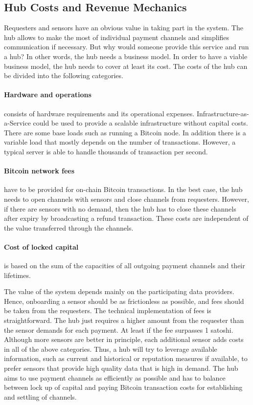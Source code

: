 \subsection{Hub Costs and Revenue Mechanics}
\label{sec:hubbiz}

Requesters and sensors have an obvious value in taking part in the system. The hub allows to make the most of individual payment channels and simplifies communication if necessary. But why would someone provide this service and run a hub? In other words, the hub needs a business model. In order to have a viable business model, the hub needs to cover at least its cost. The costs of the hub can be divided into the following categories. 

\paragraph{Hardware and operations} consists of hardware requirements and its operational expenses. Infrastructure-as-a-Service could be used to provide a scalable infrastructure without capital costs. There are some base loads such as running a Bitcoin node. In addition there is a variable load that mostly depends on the number of transactions. However, a typical server is able to handle thousands of transaction per second.

\paragraph{Bitcoin network fees} have to be provided for on-chain Bitcoin transactions. In the best case, the hub needs to open channels with sensors and close channels from requesters. However, if there are sensors with no demand, then the hub has to close these channels after expiry by broadcasting a refund transaction. These costs are independent of the value transferred through the channels.

\paragraph{Cost of locked capital} is based on the sum of the capacities of all outgoing payment channels and their lifetimes.

The value of the system depends mainly on the participating data providers. Hence, onboarding a sensor should be as frictionless as possible, and fees should be taken from the requesters. The technical implementation of fees is straightforward. The hub just requires a higher amount from the requester than the sensor demands for each payment. At least if the fee surpasses 1 satoshi. Although more sensors are better in principle, each additional sensor adds costs in all of the above categories. Thus, a hub will try to leverage available information, such as current and historical or reputation measures if available, to prefer sensors that provide high quality data that is high in demand. The hub aims to use payment channels as efficiently as possible and has to balance between lock up of capital and paying Bitcoin transaction costs for establishing and settling of channels.


